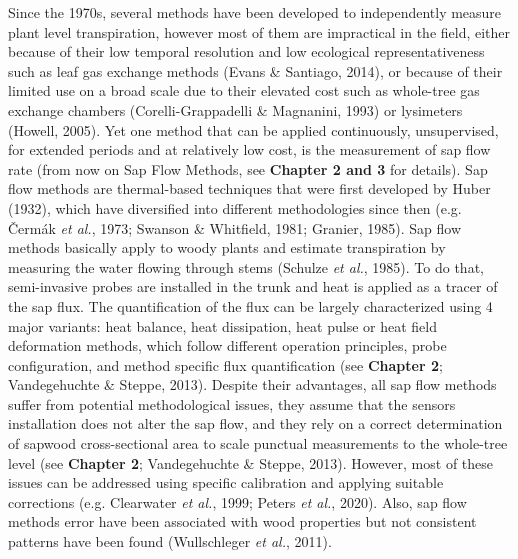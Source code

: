 \documentclass[11pt,twoside]{reedthesis}
\begin{document}
Since the 1970s, several methods have been developed to independently
measure plant level transpiration, however most of them are impractical
in the field, either because of their low temporal resolution and low
ecological representativeness such as leaf gas exchange methods (Evans
\& Santiago, 2014), or because of their limited use on a broad scale due
to their elevated cost such as whole-tree gas exchange chambers
(Corelli-Grappadelli \& Magnanini, 1993) or lysimeters (Howell, 2005).
Yet one method that can be applied continuously, unsupervised, for
extended periods and at relatively low cost, is the measurement of sap
flow rate (from now on Sap Flow Methods, see \textbf{Chapter 2 and 3}
for details). Sap flow methods are thermal-based techniques that were
first developed by Huber (1932), which have diversified into different
methodologies since then (e.g. Čermák \emph{et al.}, 1973; Swanson \&
Whitfield, 1981; Granier, 1985). Sap flow methods basically apply to
woody plants and estimate transpiration by measuring the water flowing
through stems (Schulze \emph{et al.}, 1985). To do that, semi-invasive
probes are installed in the trunk and heat is applied as a tracer of the
sap flux. The quantification of the flux can be largely characterized
using 4 major variants: heat balance, heat dissipation, heat pulse or
heat field deformation methods, which follow different operation
principles, probe configuration, and method specific flux quantification
(see \textbf{Chapter 2}; Vandegehuchte \& Steppe, 2013). Despite their
advantages, all sap flow methods suffer from potential methodological
issues, they assume that the sensors installation does not alter the sap
flow, and they rely on a correct determination of sapwood
cross-sectional area to scale punctual measurements to the whole-tree
level (see \textbf{Chapter 2}; Vandegehuchte \& Steppe, 2013). However,
most of these issues can be addressed using specific calibration and
applying suitable corrections (e.g. Clearwater \emph{et al.}, 1999;
Peters \emph{et al.}, 2020). Also, sap flow methods error have been
associated with wood properties but not consistent patterns have been
found (Wullschleger \emph{et al.}, 2011).\par
\end{document}
